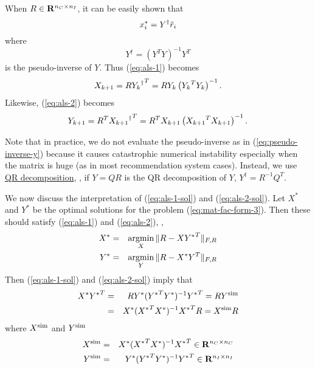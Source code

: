 When $R\in\mathbf{R}^{{n_C}\times{n_I}}$, it can be easily shown that
\begin{equation}
x_i^\ast =  Y^\dagger \tilde{r}_i
\end{equation}
where
\begin{equation}
\label{eq:pseudo-inverse-y}
Y^\dagger = (Y^TY)^{-1}Y^T
\end{equation}
is the pseudo-inverse of $Y$.
Thus (\ref{eq:als-1}) becomes
\begin{equation}
\label{eq:als-1-sol}
{{X}_{k+1}} = R {{{{Y}_{k}}}^\dagger}^T
= R {{{Y}_{k}}} \left({{{Y}_{k}}}^T{{{Y}_{k}}} \right)^{-1}.
\end{equation}
Likewise, (\ref{eq:als-2}) becomes
\begin{equation}
\label{eq:als-2-sol}
{{Y}_{k+1}} = R^T {{{{X}_{k+1}}}^\dagger}^T
= R^T {{{X}_{k+1}}} \left({{{X}_{k+1}}}^T{{{X}_{k+1}}} \right)^{-1}.
\end{equation}

Note that in practice, we do not evaluate the pseudo-inverse as in (\ref{eq:pseudo-inverse-y})
because it causes catastrophic numerical instability especially when the matrix is huge
(as in most recommendation system cases).
Instead, we use \href{https://en.wikipedia.org/wiki/QR_decomposition}{QR decomposition},
\ie, if $Y = QR$ is the QR decomposition of $Y$, $Y^\dagger = R^{-1} Q^T$.


We now discuss the interpretation of (\ref{eq:als-1-sol}) and (\ref{eq:als-2-sol}).
Let $X^\ast$ and $Y^\ast$ be the optimal solutions for the problem (\ref{eq:mat-fac-form-3}).
Then these should satisfy (\ref{eq:als-1}) and (\ref{eq:als-2}),
\ie,
\begin{eqnarray}
X^\ast &=& \mathop{\mathrm {argmin}}_{X} \|R - X{Y^\ast}^T \|_{F,R}
\\
Y^\ast &=& \mathop{\mathrm {argmin}}_{Y} \|R - X^\ast Y^T\|_{F,R}
\end{eqnarray}
Then (\ref{eq:als-1-sol}) and (\ref{eq:als-2-sol}) imply that
\begin{eqnarray}
X^\ast {Y^\ast}^T &=& R Y^\ast ({Y^\ast}^T Y^\ast)^{-1} {Y^\ast}^T = R Y^\mathrm{sim}
\\
&=& X^\ast ({X^\ast}^T X^\ast)^{-1} {X^\ast}^TR = X^\mathrm{sim} R
\end{eqnarray}
where
$X^\mathrm{sim}$
and
$Y^\mathrm{sim}$
\begin{eqnarray}
X^\mathrm{sim} &=& X^\ast ({X^\ast}^T X^\ast)^{-1} {X^\ast}^T\in \mathbf{R}^{{n_C} \times {n_C}}
\\
Y^\mathrm{sim} &=& Y^\ast ({Y^\ast}^T Y^\ast)^{-1} {Y^\ast}^T\in \mathbf{R}^{{n_I} \times {n_I}}
\end{eqnarray}


